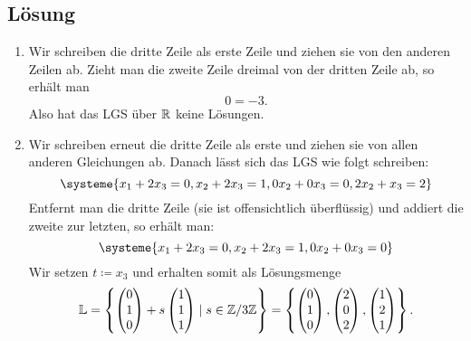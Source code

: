 \subsection{Lösung}
\begin{enumerate}
	\item Wir schreiben die dritte Zeile als erste Zeile und ziehen sie von den anderen Zeilen ab. Zieht man die zweite Zeile dreimal von der dritten Zeile ab, so erhält man
	\begin{equation*}
	 	0 = -3\text{.}
	 \end{equation*} 
	 Also hat das LGS über \( \mathbb{R} \) keine Lösungen.

	 \item Wir schreiben erneut die dritte Zeile als erste und ziehen sie von allen anderen Gleichungen ab. Danach lässt sich das LGS wie folgt schreiben:
	 \begin{equation}
	 	\label{lgs2}
	 	\systeme{x_1 + 2x_3 = 0, x_2 + 2x_3 = 1, 0x_2 + 0x_3 = 0, 2x_2 + x_3 = 2}
	 \end{equation}
	 Entfernt man die dritte Zeile (sie ist offensichtlich überflüssig)  und addiert die zweite zur letzten, so erhält man:
	 \begin{equation}
	 	\label{lgs3}
	 	\systeme{x_1 + 2x_3 = 0, x_2 + 2x_3 = 1, 0x_2 + 0x_3 = 0}
	 \end{equation}
	 Wir setzen \( t \coloneqq x_3 \) und erhalten somit als Lösungsmenge
	 \begin{equation*}
	 	\mathbb{L} = \left \{ \begin{pmatrix}
	 		0 \\ 1 \\ 0
	 	\end{pmatrix} + s \begin{pmatrix}
	 		1 \\ 1 \\ 1
	 	\end{pmatrix} \mid s \in \mathbb{Z}/3\mathbb{Z} \right \} = \left \{ \begin{pmatrix}
	 		0 \\ 1 \\ 0
	 	\end{pmatrix}, \begin{pmatrix}
	 		2 \\ 0 \\ 2
	 	\end{pmatrix}, \begin{pmatrix}
	 		1 \\ 2 \\ 1
	 	\end{pmatrix} \right \}\text{.}
	 \end{equation*}
\end{enumerate}

